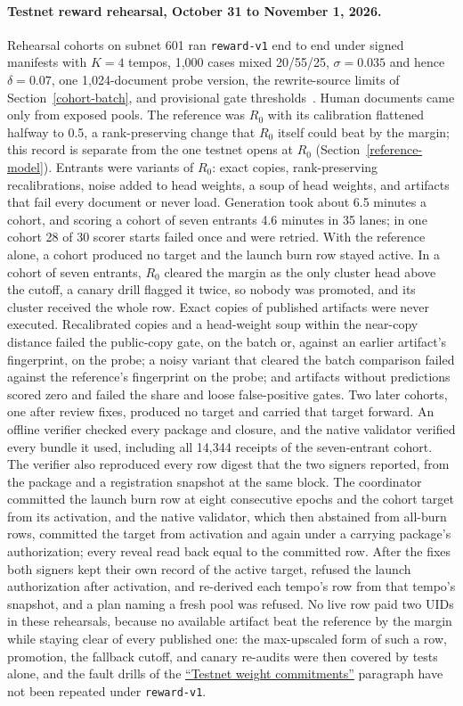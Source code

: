 \paragraph{Testnet reward rehearsal, October 31 to November 1, 2026.}\label{testnet-reward-v1}
Rehearsal cohorts on subnet 601 ran \texttt{reward-v1} end to end under signed
manifests with \(K=4\) tempos, 1,000 cases mixed 20/55/25, \(\sigma=0.035\)
and hence \(\delta=0.07\), one 1,024-document probe version, the rewrite-source
limits of Section~\ref{cohort-batch}, and provisional gate
thresholds~\cite{testnetrewardv1}. Human documents came only from exposed
pools. The reference was \(R_0\) with its calibration flattened halfway to 0.5,
a rank-preserving change that \(R_0\) itself could beat by the margin; this
record is separate from the one testnet opens at \(R_0\)
(Section~\ref{reference-model}). Entrants were variants of
\(R_0\): exact copies, rank-preserving recalibrations, noise added to head
weights, a soup of head weights, and artifacts that fail every document or
never load. Generation took about 6.5 minutes a cohort, and scoring a cohort of
seven entrants 4.6 minutes in 35 lanes; in one cohort 28 of 30 scorer starts failed
once and were retried. With the reference alone, a cohort produced no target
and the launch burn row stayed active. In a cohort of seven entrants,
\(R_0\) cleared the margin as the only cluster head above the cutoff, a canary
drill flagged it twice, so nobody was promoted, and its cluster received the
whole row. Exact copies of published artifacts were never executed.
Recalibrated copies and a head-weight soup within the near-copy distance failed
the public-copy gate, on the batch or, against an earlier artifact's
fingerprint, on the probe; a noisy variant that cleared the batch comparison
failed against the reference's fingerprint on the probe; and artifacts without
predictions scored zero and failed the share and loose false-positive gates.
Two later cohorts, one after review fixes, produced no target and carried that
target forward. An offline verifier checked every
package and closure, and the native validator verified every bundle it used,
including all 14,344 receipts of the seven-entrant cohort. The verifier also
reproduced every row digest that the two signers reported, from the package and
a registration snapshot at the same block. The coordinator committed the launch burn row at eight consecutive
epochs and the cohort target from its activation, and the native validator,
which then abstained from all-burn rows, committed the target from activation and
again under a carrying package's authorization; every reveal read back equal
to the committed row. After the fixes both signers kept their own record of
the active target, refused the launch authorization after activation, and
re-derived each tempo's row from that tempo's snapshot, and a plan naming a
fresh pool was refused. No live row paid two UIDs in these rehearsals,
because no available artifact beat the reference by the margin while staying
clear of every published one: the max-upscaled form of such a row, promotion,
the fallback cutoff, and canary re-audits were then covered by tests alone, and the
fault drills of the \hyperref[testnet-m2]{``Testnet weight commitments''}
paragraph have not been repeated under
\texttt{reward-v1}.


